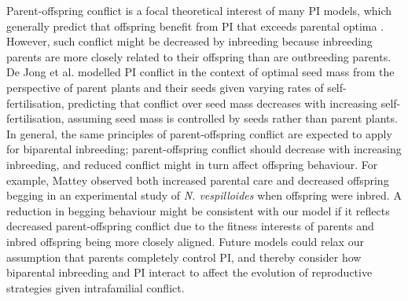 \documentclass[12pt]{article}
\begin{document}
Parent-offspring conflict is a focal theoretical interest of many PI models, which generally predict that offspring benefit from PI that exceeds parental optima \cite[][]{Macnair1978, Parker1978, Parker1985, DeJong2005}. However, such conflict might be decreased by inbreeding because inbreeding parents are more closely related to their offspring than are outbreeding parents. De Jong et al. \cite{DeJong2005} modelled PI conflict in the context of optimal seed mass from the perspective of parent plants and their seeds given varying rates of self-fertilisation, predicting that conflict over seed mass decreases with increasing self-fertilisation, assuming seed mass is controlled by seeds rather than parent plants. In general, the same principles of parent-offspring conflict are expected to apply for biparental inbreeding; parent-offspring conflict should decrease with increasing inbreeding, and reduced conflict might in turn affect offspring behaviour. For example, Mattey \cite{Mattey2014} observed both increased parental care and decreased offspring begging in an experimental study of \textit{N. vespilloides} when offspring were inbred. A reduction in begging behaviour might be consistent with our model if it reflects decreased parent-offspring conflict due to the fitness interests of parents and inbred offspring being more closely aligned. Future models could relax our assumption that parents completely control PI, and thereby consider how biparental inbreeding and PI interact to affect the evolution of reproductive strategies given intrafamilial conflict.
\end{document}

